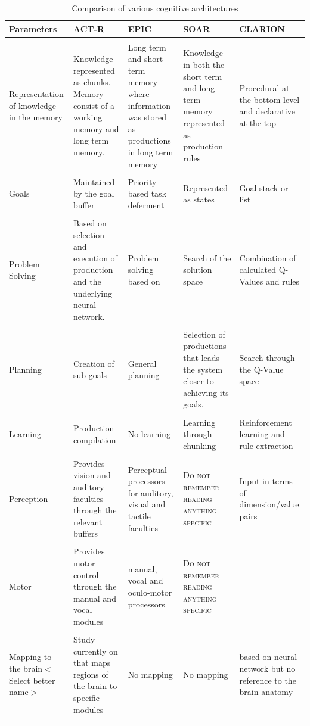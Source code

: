\begin{table}
  \centering
\caption{Comparison of various cognitive architectures}
  \begin{tabular}{p{3cm}p{4cm}p{4cm}p{4cm}p{4cm}}
  \hline
  Parameters & ACT-R & EPIC & SOAR & CLARION \\
  \hline
  & & & &\\
  Representation of knowledge in the memory & Knowledge represented as chunks. Memory consist of a
  working memory and long term memory.& Long term and short term
  memory where information was stored as productions in long term
  memory & Knowledge in both the short term and long term memory
  represented as production rules& Procedural at the bottom level and
  declarative at the top  \\
  & & & &\\
  Goals  & Maintained by the goal buffer & Priority based task
  deferment \cite{Pew:1998aa}& Represented as states & Goal stack or list \\
  & & & &\\
  Problem Solving  & Based on selection and execution of production
  and the underlying neural network.& Problem solving based on &Search
  of the solution space& Combination of calculated Q-Values and rules\\
  & & & &\\
  Planning  & Creation of sub-goals&General planning & Selection of
  productions that leads the system closer to achieving its
  goals. &Search through the Q-Value space \\
  & & & &\\
  Learning   & Production compilation&No learning & Learning through
  chunking & Reinforcement learning and rule extraction \\
  & & & &\\
  Perception & Provides vision and auditory faculties through the
  relevant buffers& Perceptual processors for auditory, visual and
  tactile faculties & \textsc{Do not remember reading anything
    specific} & Input in terms of dimension/value pairs\\
  & & & &\\
  Motor & Provides motor control through the manual and vocal modules&
  manual, vocal and oculo-motor processors
  & \textsc{Do not remember reading anything specific}&\\
  & & & &\\
  Mapping to the brain$<$Select better name$>$ & Study currently on
  that maps regions of the brain to specific modules& No mapping& No
  mapping& based on neural network but no reference to the brain anatomy\cite{Chong:2007aa} \\
  & & & &\\

\end{tabular}
\end{table}

